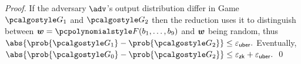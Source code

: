 \documentclass[runningheads,11pt]{llncs}
\let\spvec\vec
\let\vec\accentvec
\let\spvec\vec
\let\vec\spvec
\def\vec#1{\mathchoice{\mbox{\boldmath$\displaystyle#1$}}
  {\mbox{\boldmath$\textstyle#1$}} {\mbox{\boldmath$\scriptstyle#1$}}
  {\mbox{\boldmath$\scriptscriptstyle#1$}}}
\begin{document}
\begin{proof}
If the adversary $\adv$'s output distribution differ in Game $\game{1}$ and
$\game{2}$ then the reduction uses it to distinguish between
$\vec{w} = \pF(b_1, \ldots, b_9)$ and $\vec{w}$ being random, thus
\( \abs{\prob{\game{1}} - \prob{\game{2}}} \leq \epsuber.  \) Eventually,
\(
\abs{\prob{\game{0}} - \prob{\game{2}}} \leq \epszk + \epsuber.  \) \qed



\end{proof}
\end{document}
